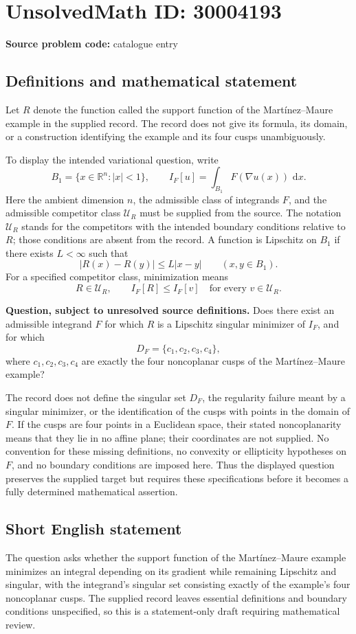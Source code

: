 \documentclass[11pt]{article}
\newcommand{\R}{\mathbb{R}}
\newcommand{\dd}{\,\mathrm{d}}
\begin{document}
\section*{UnsolvedMath ID: 30004193}
\textbf{Source problem code:} catalogue entry
\subsection{Definitions and mathematical statement}
Let \(R\) denote the function called the support function of the Mart\'inez--Maure example in the supplied record. The record does not give its formula, its domain, or a construction identifying the example and its four cusps unambiguously.

To display the intended variational question, write
\[
B_1=\{x\in\R^n:|x|<1\},\qquad
I_F[u]=\int_{B_1}F(\nabla u(x))\,\dd x.
\]
Here the ambient dimension \(n\), the admissible class of integrands \(F\), and the admissible competitor class \(\mathcal U_R\) must be supplied from the source. The notation \(\mathcal U_R\) stands for the competitors with the intended boundary conditions relative to \(R\); those conditions are absent from the record. A function is Lipschitz on \(B_1\) if there exists \(L<\infty\) such that
\[
|R(x)-R(y)|\leq L|x-y|\qquad(x,y\in B_1).
\]
For a specified competitor class, minimization means
\[
R\in\mathcal U_R,
\qquad I_F[R]\leq I_F[v]\quad\text{for every }v\in\mathcal U_R.
\]

\textbf{Question, subject to unresolved source definitions.} Does there exist an admissible integrand \(F\) for which \(R\) is a Lipschitz singular minimizer of \(I_F\), and for which
\[
D_F=\{c_1,c_2,c_3,c_4\},
\]
where \(c_1,c_2,c_3,c_4\) are exactly the four noncoplanar cusps of the Mart\'inez--Maure example?

The record does not define the singular set \(D_F\), the regularity failure meant by a singular minimizer, or the identification of the cusps with points in the domain of \(F\). If the cusps are four points in a Euclidean space, their stated noncoplanarity means that they lie in no affine plane; their coordinates are not supplied. No convention for these missing definitions, no convexity or ellipticity hypotheses on \(F\), and no boundary conditions are imposed here. Thus the displayed question preserves the supplied target but requires these specifications before it becomes a fully determined mathematical assertion.
\subsection{Short English statement}
The question asks whether the support function of the Mart\'inez--Maure example minimizes an integral depending on its gradient while remaining Lipschitz and singular, with the integrand's singular set consisting exactly of the example's four noncoplanar cusps. The supplied record leaves essential definitions and boundary conditions unspecified, so this is a statement-only draft requiring mathematical review.
\end{document}
